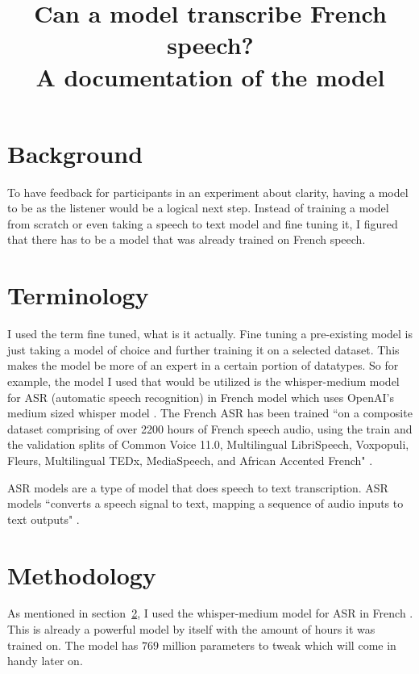 \documentclass[12pt]{article}
\title{Can a model transcribe French speech?\\A documentation of the model}
\date{}
\author{}
\begin{document}
    \singlespacing
    \setlength{\parindent}{36pt}
    \maketitle
    \section{Background}
    To have feedback for participants in an experiment about clarity, having a
    model to be as the listener would be a logical next step. Instead of training
    a model from scratch or even taking a speech to text model and fine tuning it,
    I figured that there has to be a model that was already trained on French
    speech.

    \section{Terminology}
    \label{sec:term} I used the term fine tuned, what is it actually. Fine
    tuning a pre-existing model is just taking a model of choice and further
    training it on a selected dataset. This makes the model be more of an expert in
    a certain portion of datatypes. So for example, the model I used that would be
    utilized is the \citet{huang2022whisper-medium-french} whisper-medium model
    for ASR (automatic speech recognition) in French model which uses OpenAI's
    medium sized whisper model \citep{radford2022whisper,radford2023robust}. The
    French ASR has been trained ``on a composite dataset comprising of over 2200
    hours of French speech audio, using the train and the validation splits of Common
    Voice 11.0, Multilingual LibriSpeech, Voxpopuli, Fleurs, Multilingual TEDx,
    MediaSpeech, and African Accented French" \citep{ardila2020common, Pratap2020MLSAL, wang-etal-2021-voxpopuli, fleurs2022arxiv, salesky2021mtedx, mediaspeech2021, gigant2022african-accented-french}.

    ASR models are a type of model that does speech to text transcription. ASR
    models ``converts a speech signal to text, mapping a sequence of audio inputs
    to text outputs" \citep{hf_transformers_asr_docs}.

    \section{Methodology}
    As mentioned in section~\ref{sec:term}, I used the whisper-medium model for
    ASR in French \citep{huang2022whisper-medium-french}. This is already a
    powerful model by itself with the amount of hours it was trained on. The model
    has $769$ million parameters to tweak which will come in handy later on.
\end{document}
